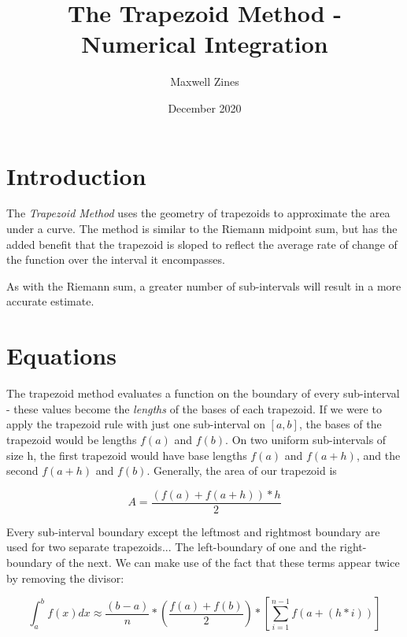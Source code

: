 \documentclass{article}
\title{The Trapezoid Method - Numerical Integration}
\author{Maxwell Zines}
\date{December 2020}
\begin{document}
\maketitle

\section{Introduction}

The {\it{Trapezoid Method}} uses the geometry of trapezoids to approximate the area under a curve. The method is similar to the Riemann midpoint sum, but has the added benefit that the trapezoid is sloped to reflect the average rate of change of the function over the interval it encompasses. 

As with the Riemann sum, a greater number of sub-intervals will result in a more accurate estimate. 

\section{Equations}

The trapezoid method evaluates a function on the boundary of every sub-interval - these values become the {\it{lengths}} of the bases of each trapezoid. If we were to apply the trapezoid rule with just one sub-interval on $[a,b]$, the bases of the trapezoid would be lengths $f(a)$ and $f(b)$. On two uniform sub-intervals of size h, the first trapezoid would have base lengths $f(a)$ and $f(a+h)$, and the second $f(a+h)$ and $f(b)$. Generally, the area of our trapezoid is

\[ A = \frac{(f(a)+f(a+h))*h}{2} \]

Every sub-interval boundary except the leftmost and rightmost boundary are used for two separate trapezoids... The left-boundary of one and the right-boundary of the next. We can make use of the fact that these terms appear twice by removing the divisor:

\[ \int_{a}^{b}f(x)dx \approx \frac{(b-a)}{n} * \left( \frac{f(a) + f(b)}{2} \right) * \left[\sum_{i=1}^{n-1}f(a+(h*i))  \right] \]
\end{document}
